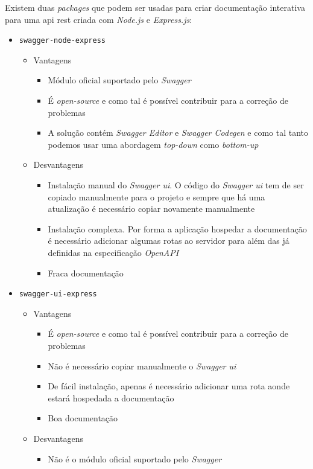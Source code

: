 Existem duas \textit{packages} que podem ser usadas para criar documentação interativa para uma \acrshort{api} \acrshort{rest} criada com \textit{Node.js} e \textit{Express.js}:~\cite{swaggerNode}
\begin{itemize}
    \item \texttt{swagger-node-express}
    \begin{itemize}
        \item Vantagens
        \begin{itemize}
            \item Módulo oficial suportado pelo \textit{Swagger}
            \item É \textit{open-source} e como tal é possível contribuir para a correção de problemas
            \item A solução contém \textit{Swagger Editor} e \textit{Swagger Codegen} e como tal tanto podemos usar uma abordagem \textit{top-down} como \textit{bottom-up}
        \end{itemize}
        \item Desvantagens
        \begin{itemize}
            \item Instalação manual do \textit{Swagger \acrshort{ui}}. O código do \textit{Swagger \acrshort{ui}} tem de ser copiado manualmente para o projeto e sempre que há uma atualização é necessário copiar novamente manualmente
            \item Instalação complexa. Por forma a aplicação hospedar a documentação é necessário adicionar algumas rotas ao servidor para além das já definidas na especificação \textit{OpenAPI}
            \item Fraca documentação
        \end{itemize}
    \end{itemize}
    \item \texttt{swagger-ui-express}
    \begin{itemize}
        \item Vantagens
        \begin{itemize}
            \item É \textit{open-source} e como tal é possível contribuir para a correção de problemas
            \item Não é necessário copiar manualmente o \textit{Swagger \acrshort{ui}}
            \item De fácil instalação, apenas é necessário adicionar uma rota aonde estará hospedada a documentação
            \item Boa documentação
        \end{itemize}
        \item Desvantagens
        \begin{itemize}
            \item Não é o módulo oficial suportado pelo \textit{Swagger}
        \end{itemize}
    \end{itemize}
\end{itemize}

